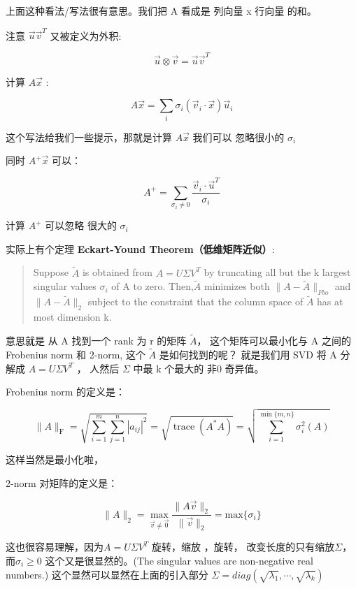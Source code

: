 \documentclass[
]{book}
\begin{document}
上面这种看法/写法很有意思。我们把 A 看成是 列向量 x 行向量 的和。

注意 \(\vec{u} \vec{v}^T\) 又被定义为外积:

\[\vec{u} \otimes \vec{v} = \vec{u} \vec{v}^T\]

计算 \(A\vec{x}\) :

\[A\vec{x} = \sum_i \sigma_i (\vec{v}_i \cdot \vec{x}) \vec{u}_i\]

这个写法给我们一些提示，那就是计算 \(A\vec{x}\) 我们可以 忽略很小的 \(\sigma_i\)

同时 \(A^+\vec{x}\) 可以：

\[A^+ = \sum_{\sigma_i \ne 0} \frac{\vec{v}_i \cdot \vec{u}^T}{\sigma_i }\]

计算 \(A^+\) 可以忽略 很大的 \(\sigma_i\)

实际上有个定理 \textbf{Eckart-Yound Theorem（低维矩阵近似）}:

\begin{quote}
Suppose \(\widetilde{A}\) is obtained from \(A = U\Sigma V^T\) by truncating all but the k largest singular values \(\sigma_i\) of A to zero. Then,\(\widetilde{A}\) minimizes both
\(\parallel A - \widetilde{A} \parallel _{Fbo}\) and \(\parallel A - \widetilde{A} \parallel _2\) subject to the constraint that the column space of \(\tilde{A}\) has at most dimension k.
\end{quote}

意思就是 从 A 找到一个 rank 为 r 的矩阵 \(\widetilde{A}\)， 这个矩阵可以最小化与 A 之间的 Frobenius norm 和 2-norm, 这个 \(\widetilde{A}\) 是如何找到的呢？ 就是我们用 SVD 将 A 分解成 \(A = U\Sigma V^T\) ， 人然后 \(\Sigma\) 中最 k 个最大的 非0 奇异值。

Frobenius norm 的定义是：

\[
{\displaystyle \|A\|_{\text{F}}={\sqrt {\sum _{i=1}^{m}\sum _{j=1}^{n}|a_{ij}|^{2}}}={\sqrt {\operatorname {trace} \left(A^{*}A\right)}}={\sqrt {\sum _{i=1}^{\min\{m,n\}}\sigma _{i}^{2}(A)}}}
\]

这样当然是最小化啦，

2-norm 对矩阵的定义是：

\[{\displaystyle \parallel A\parallel _2 = \max _{{\vec {v}}\neq {\vec {0}}}{\frac {\parallel A{\vec {v}}\parallel _{2}}{\parallel {\vec {v}}\parallel _{2}}}} = \text{max} \{ \sigma_i \}\]

这也很容易理解，因为\(A = U \Sigma V^T\) 旋转，缩放 ，旋转， 改变长度的只有缩放\(\Sigma\)， 而\(\sigma_i \ge 0\) 这个又是很显然的。(The singular values are non-negative real numbers.) 这个显然可以显然在上面的引入部分 \(\Sigma = diag (\sqrt{\lambda_1}, \cdots, \sqrt{\lambda_k})\)
\end{document}
